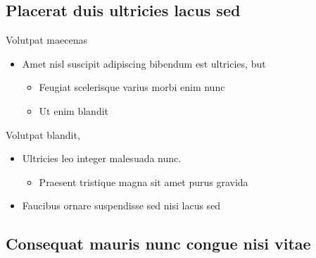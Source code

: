 \subsection{Placerat duis ultricies lacus sed}


\begin{frame}{Volutpat maecenas}
    \begin{itemize}
        \item Amet nisl suscipit adipiscing bibendum est ultricies, but
        \begin{itemize}
            \item Feugiat scelerisque varius morbi enim nunc\cite{hessman_spontaneous_2023}
            \item Ut enim blandit 
        \end{itemize}
     \end{itemize}
     \bigskip
     Volutpat blandit,
     \begin{itemize}
        \item Ultricies leo integer malesuada nunc. 
        \begin{itemize}
            \item Praesent tristique magna sit amet purus gravida
        \end{itemize}
        \item Faucibus ornare suspendisse\cite{demaine_super_2016} sed nisi lacus sed
    \end{itemize}
\end{frame}

\subsection{Consequat mauris nunc congue nisi vitae}

